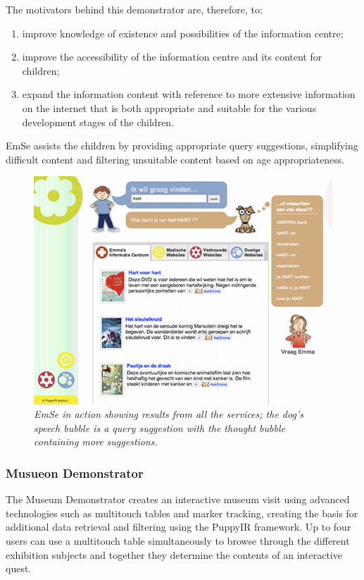 \documentclass[letterpaper,10pt,english]{sphinxmanual}
\begin{document}
The motivators behind this demonstrator are, therefore, to:
\begin{enumerate}
\item {} 
improve knowledge of existence and possibilities of the information centre;

\item {} 
improve the accessibility of the information centre and its content for children;

\item {} 
expand the information content with reference to more extensive information on the internet that is both appropriate and suitable for the various development stages of the children.

\end{enumerate}

EmSe assists the children by providing appropriate query suggestions, simplifying difficult content and filtering unsuitable content based on age appropriateness.
\begin{figure}[htbp]
\centering
\capstart

\includegraphics{puppy-emse.png}
\caption{\emph{EmSe in action showing results from all the services; the dog's speech bubble is a query suggestion with the thought bubble containing more suggestions.}}\end{figure}


\subsubsection{Musueon Demonstrator}
\label{repo:musueon-demonstrator}
The Museum Demonstrator creates an interactive museum visit using advanced  technologies such as multitouch tables and marker tracking, creating the basis for additional data retrieval and filtering using the PuppyIR framework. Up to four users can use a multitouch table simultaneously to browse through the different exhibition subjects and together they determine the contents of an interactive quest.
\end{document}
